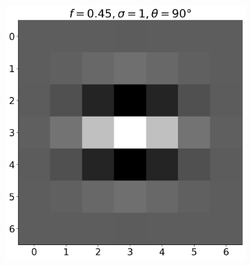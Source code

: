 \documentclass[12pt,a4paper, english]{article}
\begin{document}
\begin{figure}[!htbp]
\begin{subfigure}[b]{0.3\textwidth}
      \end{subfigure}
      \begin{subfigure}[b]{0.3\textwidth}
        \includegraphics[width=\textwidth]{img/K8.png}
      \end{subfigure}


\end{figure}
\end{document}
